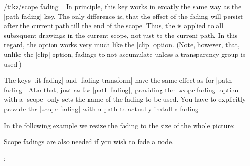 \begin{key}{/tikz/scope fading=}
  In principle, this key works in excatly the same way as the
  |path fading| key. The only difference is, that the effect of the
  fading will persist after the current path till the end of the
  scope. Thus, the  is applied to all subsequent drawings
  in the current scope, not just to the current path. In this regard,
  the option works very much like the |clip| option. (Note, however,
  that, unlike the |clip| option, fadings to not accumulate unless a
  transparency group is used.)

  The keys |fit fading| and |fading transform| have the same effect as
  for |path fading|. Also that, just as for |path fading|, providing
  the |scope fading| option with a |{scope}| only sets the name of the
  fading to be used. You have to explicitly provide the |scope fading|
  with a path to actually install a fading.
  
\begin{codeexample}[]
\end{codeexample}

  In the following example we resize the fading to the size of the
  whole picture:
\begin{codeexample}[]
\end{codeexample}

  Scope fadings are also needed if you wish to fade a node.
\begin{codeexample}[]
\tikz {};    
\end{codeexample}

\end{key}


